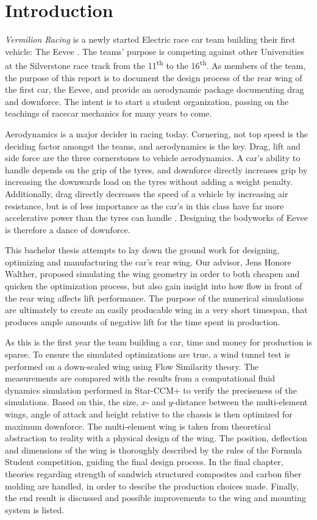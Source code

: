 \chapter{Introduction}
  \emph{Vermilion Racing} is a newly started Electric race car team building their first vehicle: The Eevee \cite{bulba}. The teams' purpose is competing against other Universities at the Silverstone race track from the 11\textsuperscript{th} to the 16\textsuperscript{th}. As members of the team, the purpose of this report is to document the design process of the rear wing of the first car, the Eevee, and provide an aerodynamic package documenting drag and downforce. The intent is to start a student organization, passing on the teachings of racecar mechanics for many years to come.

  Aerodynamics is a major decider in racing today. Cornering, not top speed is the deciding factor amongst the teams, and aerodynamics is the key. Drag, lift and side force are the three cornerstones to vehicle aerodynamics. A car's ability to handle depends on the grip of the tyres, and downforce directly increases grip by increasing the downwards load on the tyres without adding a weight penalty. Additionally, drag directly decreases the speed of a vehicle by increasing air resistance, but is of less importance as the car's in this class have far more accelerative power than the tyres can handle \cite{jkatz}. Designing the bodyworks of Eevee is therefore a dance of downforce.

  This bachelor thesis attempts to lay down the ground work for designing, optimizing and manufacturing the car's rear wing. Our advisor, Jens Honore Walther, proposed simulating the wing geometry in order to both cheapen and quicken the optimization process, but also gain insight into how flow in front of the rear wing affects lift performance.  The purpose of the numerical simulations are ultimately to create an easily producable wing in a very short timespan, that produces ample amounts of negative lift for the time spent in production.

  As this is the first year the team building a car, time and money for production is sparse. To ensure the simulated optimizations are true, a wind tunnel test is performed on a down-scaled wing using Flow Similarity theory. The measurements are compared with the results from a computational fluid dynamics simulation performed in Star-CCM+ to verify the preciseness of the simulations. Based on this, the size, $x$- and $y$-distance between the multi-element wings, angle of attack and height relative to the chassis is then optimized for maximum downforce. The multi-element wing is taken from theoretical abstraction to reality with a physical design of the wing. The position, deflection and dimensions of the wing is thoroughly described by the rules of the Formula Student competition, guiding the final design process. In the final chapter, theories regarding strength of sandwich structured composites and carbon fiber molding are handled, in order to descibe the production choices made. Finally, the end result is discussed and possible improvements to the wing and mounting system is listed.

